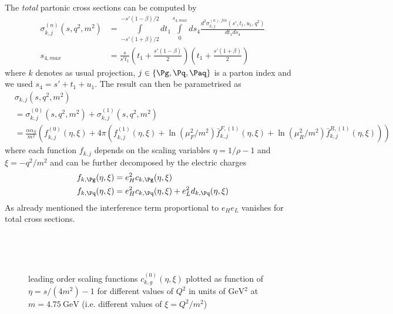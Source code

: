 The \textit{total} partonic cross sections can be computed by
\begin{align}
\sigma^{(n)}_{k,j}(s,q^2,m^2) &= \int\limits_{-s'(1+\beta)/2}^{-s'(1-\beta)/2} dt_1\int\limits_0^{s_{4,max}}ds_4 \frac{d^2\sigma^{(n),fin}_{k,j}(s',t_1,u_1,q^2)}{dt_1ds_4}\\
s_{4,max} &= \frac{s}{s' t_1}\left(t_1+\frac{s'(1-\beta)}{2}\right)\left(t_1+\frac{s'(1+\beta)}{2}\right)
\end{align}
where $k$ denotes as usual projection, $j\in\{\Pg,\Pq,\Paq\}$ is a parton index and we used $s_4 = s'+t_1+u_1$. The result can then be parametrised as
\begin{align}
&\sigma_{k,j}(s,q^2,m^2)\nonumber\\
 &= \sigma^{(0)}_{k,j}(s,q^2,m^2) + \sigma^{(1)}_{k,j}(s,q^2,m^2)\\
 &= \frac{\alpha\alpha_S}{m^2}\left(f_{k,j}^{(0)}(\eta,\xi) + 4\pi\left(f_{k,j}^{(1)}(\eta,\xi) + \ln(\mu_F^2/m^2)\bar f_{k,j}^{F,(1)}(\eta,\xi) + \ln(\mu_R^2/m^2)\bar f_{k,j}^{R,(1)}(\eta,\xi)\right)\right)
\end{align}
where each function $f_{k,j}$ depends on the scaling variables $\eta=1/\rho-1$ and $\xi=-q^2/m^2$ and can be further decomposed by the electric charges
\begin{align}
f_{k,\Pg}(\eta,\xi) &= e_H^2 c_{k,\Pg}(\eta,\xi)\\
f_{k,\Pq}(\eta,\xi) &= e_H^2 c_{k,\Pq}(\eta,\xi) + e_L^2 d_{k,\Pq}(\eta,\xi)
\end{align}
As already mentioned the interference term proportional to $e_H e_L$ vanishes for total cross sections.


\pagebreak
\begin{figure}[ht!]
\centering
\begin{subfigure}[t]{\textwidth}
	
\end{subfigure}\\%
\begin{subfigure}[t]{\textwidth}
	
\end{subfigure}\\%
\begin{subfigure}[t]{\textwidth}
	
\end{subfigure}
\caption{leading order scaling functions $c_{k,g}^{(0)}(\eta,\xi)$ plotted as function of $\eta=s/(4m^2)-1$ for different values of $Q^2$ in units of $\si{\GeV^2}$ at $m=\SI{4.75}{\GeV}$ (i.e. different values of $\xi=Q^2/m^2$) }\label{fig:cg0}
\end{figure}

